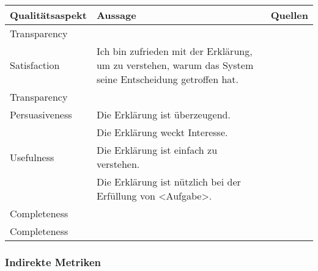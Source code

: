\begin{table}
    \begin{center}
        \begin{tabular}{|p{} p{} p{}|}
            \hline
            \textbf{Qualitätsaspekt} & \textbf{Aussage} & \textbf{Quellen} \\
            \hline
            \hline
            Transparency    & & \\
            \hline
            Satisfaction    & Ich bin zufrieden mit der Erklärung, um zu verstehen, warum das System seine Entscheidung 
                                getroffen hat.
                                & \cite[vgl.][]{riveiro_thats_2021} \\
            \hline
            Transparency    & & \\
            \hline
            Persuasiveness  & Die Erklärung ist überzeugend.
                                & \cite[vgl.][]{sato_action-triggering_2019, sato_context_nodate} \\
                            & Die Erklärung weckt Interesse. 
                                & \cite[vgl.][]{sato_action-triggering_2019, sato_context_nodate} \\
            \hline
            Usefulness      & Die Erklärung ist einfach zu verstehen. 
                                & \cite[vgl.][]{sato_action-triggering_2019, sato_context_nodate} \\
                            & Die Erklärung ist nützlich bei der Erfüllung von <Aufgabe>.
                                & \cite[vgl.][]{sato_action-triggering_2019, sato_context_nodate} \\
            \hline
            Completeness    & & \\
            \hline
            Completeness    & & \\
            \hline
        \end{tabular}
    \end{center}
    \caption{}
    \label{tab:evaluation_direct_measures_evaluation}
\end{table}

\subsubsection{Indirekte Metriken}

